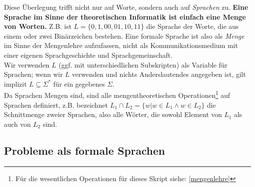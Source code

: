 
Diese Überlegung trifft nicht nur auf Worte, sondern auch auf \emph{Sprachen} zu.
\textbf{Eine Sprache im Sinne der theoretischen Informatik ist einfach eine Menge von Worten.}
Z.B. ist $L = \{0, 1, 00, 01, 10, 11 \}$ die Sprache der Worte,
die aus einem oder zwei Binärzeichen bestehen.
Eine formale Sprache ist also als \emph{Menge} im Sinne der Mengenlehre aufzufassen,
nicht als Kommunikationsmedium mit einer eigenen Sprachgeschichte und Sprachgemeinschaft.\\

\noindent
Wir verwenden $L$ (ggf. mit unterschiedlichen Subskripten) als Variable für Sprachen;
wenn wir $L$ verwenden und nichts Anderslautendes angegeben ist,
gilt implizit $L \subseteq \Sigma^*$ für ein gegebenes $\Sigma$.\\

\noindent
Da Sprachen Mengen sind,
sind alle mengentheoretischen Operationen\footnote{
    Für die wesentlichen Operationen für dieses Skript siehe: \autoref{mengenlehre}}
auf Sprachen definiert,
z.B. bezeichnet $L_1 \cap L_2 = \{w | w \in L_1 \wedge w \in L_2\}$
die Schnittmenge zweier Sprachen, also alle Wörter,
die sowohl Element von $L_1$ als auch von $L_2$ sind.



\subsection{Probleme als formale Sprachen}\label{subsec:problemeAlsFormaleSprachen}

